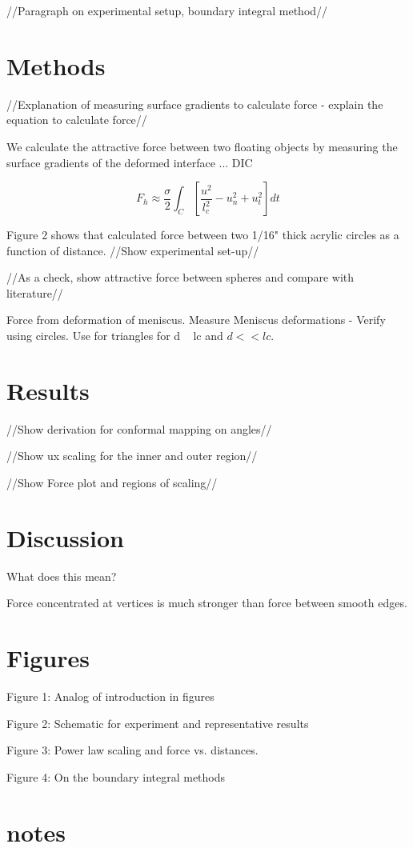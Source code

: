 \documentclass[twocolumn,prl]{revtex4-1}
\begin{document}
//Paragraph on experimental setup, boundary integral method//
	 

\section{Methods}
//Explanation of measuring surface gradients to calculate force - explain the equation to calculate force//

We calculate the attractive force between two floating objects by measuring the surface gradients of the deformed interface ... DIC

\begin{equation}
F_h \approx \frac{\sigma}{2} \int _C [\frac{u^2}{l_c^2}- u_n^2 +u_t^2] dt
\end{equation}

Figure 2 shows that calculated force between two 1/16" thick acrylic circles as a function of distance.
//Show experimental set-up//

//As a check, show attractive force between spheres and compare with literature//

Force from deformation of meniscus. Measure Meniscus deformations - Verify using circles. Use for triangles for d ~ lc and $d << lc$.

\section{Results}
//Show derivation for conformal mapping on angles//

//Show ux scaling for the inner and outer region//

//Show Force plot and regions of scaling//

\section{Discussion}
What does this mean?

Force concentrated at vertices is much stronger than force between smooth edges.

\section{Figures}
Figure 1: Analog of introduction in figures

Figure 2: Schematic for experiment and representative results 

Figure 3: Power law scaling and force vs. distances.

Figure 4: On the boundary integral methods

\section{notes}
\end{document}
